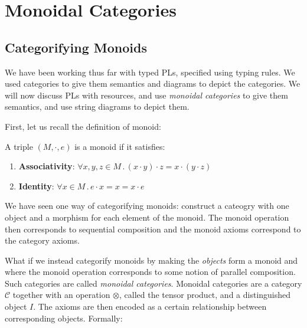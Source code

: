 \chapter{Monoidal Categories}

\section{Categorifying Monoids}

We have been working thus far with typed PLs, specified using 
typing rules. We used categories to give them semantics and 
diagrams to depict the categories. We will now discuss PLs 
with resources, and use \emph{monoidal categories} to give 
them semantics, and use string diagrams to depict them.

First, let us recall the definition of monoid:


\begin{definition}[monoid]
    A triple $(M, \cdot, e)$ is a monoid if it satisfies:
    \begin{enumerate}
        \item \textbf{Associativity}: $\forall x, y, z \in M
            \,.\, (x \cdot y) \cdot z = x \cdot (y \cdot z)$
        \item \textbf{Identity}: $\forall x \in M \,.\,
            e \cdot x = x = x \cdot e$
    \end{enumerate}
\end{definition}

We have seen one way of categorifying monoids: construct a cateogry 
with one object and a morphism for each element of the monoid.
The monoid operation then corresponds to sequential composition 
and the monoid axioms correspond to the category axioms.

What if we instead categorify monoids by making the \emph{objects} form
a monoid and where the monoid operation corresponds to some notion
of parallel composition. Such categories are called 
\emph{monoidal categories}.
Monoidal categories are a category \(\mathcal{C}\) together with an
operation \(\otimes\), called the tensor product, and a distinguished
object \(I\). The axioms are then encoded as a certain relationship
between corresponding objects. Formally:


